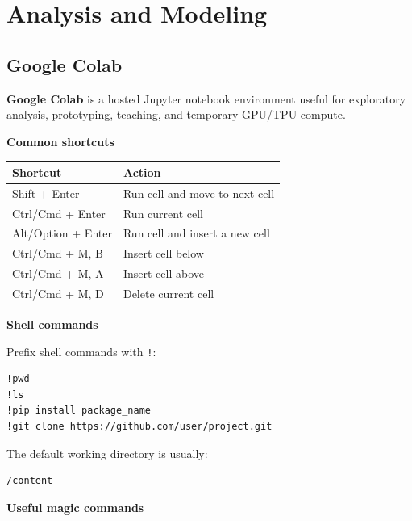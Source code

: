 \documentclass[11pt,letterpaper]{article}
\begin{document}

\section{Analysis and Modeling}


\subsection{Google Colab}

\textbf{Google Colab} is a hosted Jupyter notebook environment useful for
exploratory analysis, prototyping, teaching, and temporary GPU/TPU compute.

\textbf{Common shortcuts}

\begin{center}
\begin{tabularx}{\textwidth}{lX}
\toprule
Shortcut & Action \\
\midrule
Shift + Enter & Run cell and move to next cell \\
Ctrl/Cmd + Enter & Run current cell \\
Alt/Option + Enter & Run cell and insert a new cell \\
Ctrl/Cmd + M, B & Insert cell below \\
Ctrl/Cmd + M, A & Insert cell above \\
Ctrl/Cmd + M, D & Delete current cell \\
\bottomrule
\end{tabularx}
\end{center}

\textbf{Shell commands}

Prefix shell commands with \texttt{!}:

\begin{lstlisting}
!pwd
!ls
!pip install package_name
!git clone https://github.com/user/project.git
\end{lstlisting}

The default working directory is usually:

\begin{lstlisting}
/content
\end{lstlisting}

\textbf{Useful magic commands}
\end{document}
